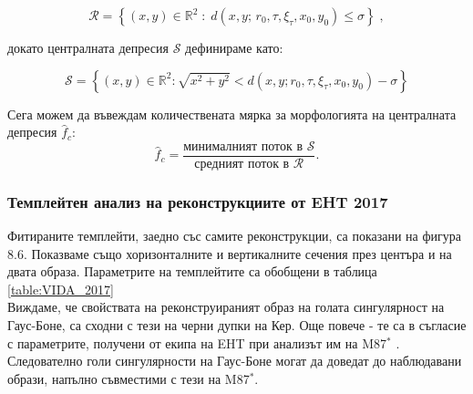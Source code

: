 \begin{equation}
	\mathcal{R}=\left\lbrace
	(x,y)\in\mathbb{R}^2\;:\;d(x,y;\,r_0,\tau,\xi_\tau,x_0,y_0)\leqslant\sigma\right\rbrace\;,
\end{equation}

докато централната депресия $\mathcal{S}$ дефинираме като:

\begin{equation}
	\mathcal{S} = \left\lbrace (x,y)\in\mathbb{R}^2: \sqrt{x^2 + y^2} < d(x,y;r_0,\tau,\xi_\tau,x_0,y_0) - \sigma\right\rbrace
\end{equation}

Сега можем да въвеждам количествената мярка за морфологията на централната депресия $\hat{f}_c$:
\begin{equation}
	\hat{f}_c = \frac{\text{минималният поток в }\mathcal{S}}{\text{средният поток в }\mathcal{R}}.
\end{equation}

\subsubsection{Темплейтен анализ на реконструкциите от EHT 2017}

Фитираните темплейти, заедно със самите реконструкции, са показани на фигура 8.6. Показваме също хоризонталните и вертикалните сечения през центъра и на двата образа. Параметрите на темплейтите са обобщени в таблица \ref{table:VIDA_2017}\\

Виждаме, че свойствата на реконструираният образ на голата сингулярност на Гаус-Боне, са сходни с тези на черни дупки на Кер. Още повече - те са в съгласие с параметрите, получени от екипа на EHT при анализът им на M87$^*$ \cite{EHT_M87_VI}. Следователно голи сингулярности на Гаус-Боне могат да доведат до наблюдавани образи, напълно съвместими с тези на M87$^*$.\\

